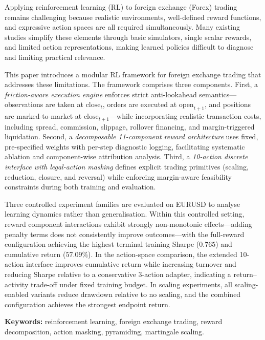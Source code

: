 Applying reinforcement learning (RL) to foreign exchange (Forex) trading remains challenging because realistic environments, well-defined reward functions, and expressive action spaces are all required simultaneously. Many existing studies simplify these elements through basic simulators, single scalar rewards, and limited action representations, making learned policies difficult to diagnose and limiting practical relevance.

This paper introduces a modular RL framework for foreign exchange trading that addresses these limitations. The framework comprises three components. First, a \emph{friction-aware execution engine} enforces strict anti-lookahead semantics---observations are taken at $\mathrm{close}_t$, orders are executed at $\mathrm{open}_{t+1}$, and positions are marked-to-market at $\mathrm{close}_{t+1}$---while incorporating realistic transaction costs, including spread, commission, slippage, rollover financing, and margin-triggered liquidation. Second, a \emph{decomposable 11-component reward architecture} uses fixed, pre-specified weights with per-step diagnostic logging, facilitating systematic ablation and component-wise attribution analysis. Third, a \emph{10-action discrete interface with legal-action masking} defines explicit trading primitives (scaling, reduction, closure, and reversal) while enforcing margin-aware feasibility constraints during both training and evaluation.

Three controlled experiment families are evaluated on EURUSD to analyse learning dynamics rather than generalisation. Within this controlled setting, reward component interactions exhibit strongly non-monotonic effects---adding penalty terms does not consistently improve outcomes---with the full-reward configuration achieving the highest terminal training Sharpe ($0.765$) and cumulative return ($57.09\%$). In the action-space comparison, the extended 10-action interface improves cumulative return while increasing turnover and reducing Sharpe relative to a conservative 3-action adapter, indicating a return--activity trade-off under fixed training budget. In scaling experiments, all scaling-enabled variants reduce drawdown relative to no scaling, and the combined configuration achieves the strongest endpoint return.

\textbf{Keywords:} reinforcement learning, foreign exchange trading, reward decomposition, action masking, pyramiding, martingale scaling.